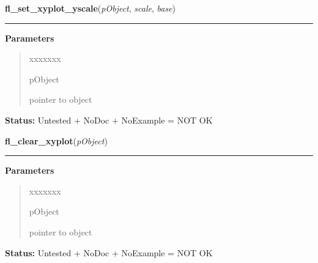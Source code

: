 \hspace{.8\funcindent}\begin{boxedminipage}{\funcwidth}

    \raggedright \textbf{fl\_set\_xyplot\_yscale}(\textit{pObject}, \textit{scale}, \textit{base})

    \vspace{-1.5ex}

    \rule{\textwidth}{0.5\fboxrule}
\setlength{\parskip}{2ex}
\setlength{\parskip}{1ex}
      \textbf{Parameters}
      \vspace{-1ex}

      \begin{quote}
        \begin{Ventry}{xxxxxxx}

          \item[pObject]

          pointer to object

        \end{Ventry}

      \end{quote}

\textbf{Status:} Untested + NoDoc + NoExample = NOT OK



    \end{boxedminipage}

    \label{xformslib:library:fl_clear_xyplot}

    \vspace{0.5ex}

\hspace{.8\funcindent}\begin{boxedminipage}{\funcwidth}

    \raggedright \textbf{fl\_clear\_xyplot}(\textit{pObject})

    \vspace{-1.5ex}

    \rule{\textwidth}{0.5\fboxrule}
\setlength{\parskip}{2ex}
\setlength{\parskip}{1ex}
      \textbf{Parameters}
      \vspace{-1ex}

      \begin{quote}
        \begin{Ventry}{xxxxxxx}

          \item[pObject]

          pointer to object

        \end{Ventry}

      \end{quote}

\textbf{Status:} Untested + NoDoc + NoExample = NOT OK



    \end{boxedminipage}

